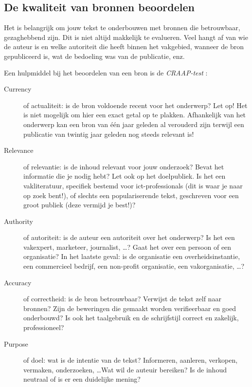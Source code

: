\subsection{De kwaliteit van bronnen beoordelen}%
\label{sub:de-kwaliteit-van-bronnen-beoordelen}

Het is belangrijk om jouw tekst te onderbouwen met bronnen die betrouwbaar, gezaghebbend zijn. Dit is niet altijd makkelijk te evalueren. Veel hangt af van wie de auteur is en welke autoriteit die heeft binnen het vakgebied, wanneer de bron gepubliceerd is, wat de bedoeling was van de publicatie, enz.

Een hulpmiddel bij het beoordelen van een bron is de \emph{CRAAP-test} \autocite{Blakeslee2004}:

\begin{description}
  \item[Currency] of actualiteit: is de bron voldoende recent voor het onderwerp? Let op! Het is niet mogelijk om hier een exact getal op te plakken. Afhankelijk van het onderwerp kan een bron van één jaar geleden al verouderd zijn terwijl een publicatie van twintig jaar geleden nog steeds relevant is!

  \item[Relevance] of relevantie: is de inhoud relevant voor jouw onderzoek? Bevat het informatie die je nodig hebt? Let ook op het doelpubliek. Is het een vakliteratuur, specifiek bestemd voor ict-professionals (dit is waar je naar op zoek bent!), of slechts een populariserende tekst, geschreven voor een groot publiek (deze vermijd je best!)?

  \item[Authority] of autoriteit: is de auteur een autoriteit over het onderwerp? Is het een vakexpert, marketeer, journalist, \ldots? Gaat het over een persoon of een organisatie? In het laatste geval: is de organisatie een overheidsinstantie, een commercieel bedrijf, een non-profit organisatie, een vakorganisatie, \ldots?
  
  \item[Accuracy] of correctheid: is de bron betrouwbaar? Verwijst de tekst zelf naar bronnen? Zijn de beweringen die gemaakt worden verifieerbaar en goed onderbouwd? Is ook het taalgebruik en de schrijfstijl correct en zakelijk, professioneel?

  \item[Purpose] of doel: wat is de intentie van de tekst? Informeren, aanleren, verkopen, vermaken, onderzoeken, \ldots Wat wil de auteuir bereiken? Is de inhoud neutraal of is er een duidelijke mening?
\end{description}

